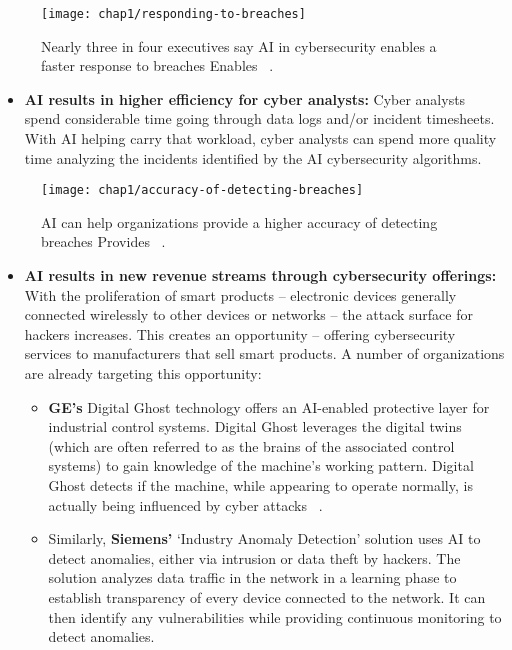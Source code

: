 \begin{figure}[h]
   \center
   \texttt{[image: chap1/responding-to-breaches]} 
   \caption{Nearly three in four executives say AI in cybersecurity enables a faster response to breaches
   Enables ~\cite{Capgemini2019}.}
   \label{fig-responding-to-breaches}
\end{figure}

\begin{itemize}
   \item {
      \textbf{AI results in higher efficiency for cyber analysts:} Cyber analysts spend considerable time going through data logs and/or incident timesheets. With AI helping carry that workload, cyber analysts can spend more quality time analyzing the incidents identified by the AI cybersecurity algorithms.
   }
\end{itemize}

\begin{figure}[ht]
   \center
   \texttt{[image: chap1/accuracy-of-detecting-breaches]} 
   \caption{AI can help organizations provide a higher accuracy of detecting breaches
   Provides ~\cite{Capgemini2019}.}
   \label{fig-accuracy-of-detecting-breaches}
\end{figure}

\begin{itemize}
   \item {
      \textbf{AI results in new revenue streams through cybersecurity offerings:}
      With the proliferation of smart products – electronic devices generally connected wirelessly to other devices or networks – the attack surface for hackers increases. This creates an opportunity – offering cybersecurity services to manufacturers that sell smart products. A number of organizations are already targeting this opportunity:
          \begin{itemize}
             \item {
               \textbf{GE’s} Digital Ghost technology offers an AI-enabled protective layer for industrial control systems. Digital Ghost leverages the digital twins (which are often referred to as the brains of the associated control systems) to gain knowledge of the machine’s working pattern. Digital Ghost detects if the machine, while appearing to operate normally, 
               is actually being influenced by cyber attacks ~\cite{GEResearch2019}.
             }
             \item {
               Similarly, \textbf{Siemens’} ‘Industry Anomaly Detection’ solution uses AI to detect anomalies, either via intrusion or data theft by hackers. The solution analyzes data traffic in the network in a learning phase to establish transparency 
               of every device connected to the network. It can then identify any vulnerabilities while providing continuous monitoring to detect anomalies. ~\cite{Siemens20118}
             }
          \end{itemize}  
      }
\end{itemize}

